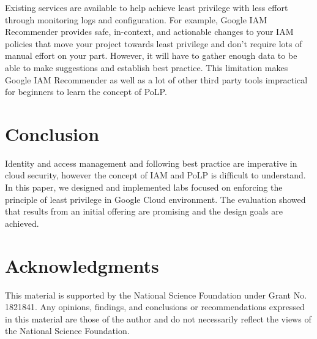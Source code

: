 \documentclass[sigconf]{acmart}
\begin{document}
Existing services are available to help achieve least privilege with less effort through monitoring logs and configuration. For example, Google IAM Recommender \cite{GoogleLstRec} provides safe, in-context, and actionable changes to your IAM policies that move your project towards least privilege and don’t require lots of manual effort on your part. However, it will have to gather enough data to be able to make suggestions and establish best practice. This limitation makes Google IAM Recommender as well as a lot of other third party tools impractical for beginners to learn the concept of PoLP.
\section{Conclusion}

Identity and access management and following best practice are imperative in cloud security, however the concept of IAM and PoLP is difficult to understand. In this paper, we designed and implemented labs focused on enforcing the principle of least privilege in Google Cloud environment. The evaluation showed that results from an initial offering are promising and the design goals are achieved. 

\section{Acknowledgments}

This material is supported by the National Science Foundation under Grant No. 1821841. Any
opinions, findings, and conclusions or recommendations expressed in this material are those of the author and do not necessarily reflect the views of the National Science Foundation.






\appendix
\end{document}

